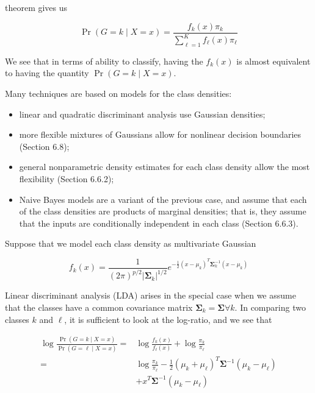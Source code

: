 \documentclass[10pt]{article}
\begin{document}
theorem gives us


\begin{equation*}
\operatorname{Pr}(G=k \mid X=x)=\frac{f_{k}(x) \pi_{k}}{\sum_{\ell=1}^{K} f_{\ell}(x) \pi_{\ell}} \tag{4.7}
\end{equation*}


We see that in terms of ability to classify, having the $f_{k}(x)$ is almost equivalent to having the quantity $\operatorname{Pr}(G=k \mid X=x)$.

Many techniques are based on models for the class densities:

\begin{itemize}
  \item linear and quadratic discriminant analysis use Gaussian densities;
  \item more flexible mixtures of Gaussians allow for nonlinear decision boundaries (Section 6.8);
  \item general nonparametric density estimates for each class density allow the most flexibility (Section 6.6.2);
  \item Naive Bayes models are a variant of the previous case, and assume that each of the class densities are products of marginal densities; that is, they assume that the inputs are conditionally independent in each class (Section 6.6.3).
\end{itemize}

Suppose that we model each class density as multivariate Gaussian


\begin{equation*}
f_{k}(x)=\frac{1}{(2 \pi)^{p / 2}\left|\boldsymbol{\Sigma}_{k}\right|^{1 / 2}} e^{-\frac{1}{2}\left(x-\mu_{k}\right)^{T} \boldsymbol{\Sigma}_{k}^{-1}\left(x-\mu_{k}\right)} \tag{4.8}
\end{equation*}


Linear discriminant analysis (LDA) arises in the special case when we assume that the classes have a common covariance matrix $\boldsymbol{\Sigma}_{k}=\boldsymbol{\Sigma} \forall k$. In comparing two classes $k$ and $\ell$, it is sufficient to look at the log-ratio, and we see that


\begin{align*}
\log \frac{\operatorname{Pr}(G=k \mid X=x)}{\operatorname{Pr}(G=\ell \mid X=x)}= & \log \frac{f_{k}(x)}{f_{\ell}(x)}+\log \frac{\pi_{k}}{\pi_{\ell}} \\
= & \log \frac{\pi_{k}}{\pi_{\ell}}-\frac{1}{2}\left(\mu_{k}+\mu_{\ell}\right)^{T} \boldsymbol{\Sigma}^{-1}\left(\mu_{k}-\mu_{\ell}\right)  \tag{4.9}\\
& +x^{T} \boldsymbol{\Sigma}^{-1}\left(\mu_{k}-\mu_{\ell}\right)
\end{align*}
\end{document}
